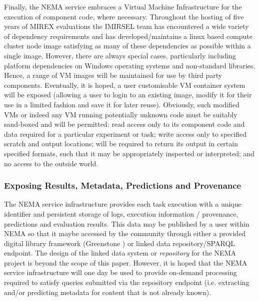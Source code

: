 \documentclass[conference]{IEEEtran}
\begin{document}
Finally, the NEMA service embraces a Virtual Machine Infrastructure for the execution of component code, where necessary. Throughout the hosting of five years of MIREX evaluations the IMIRSEL team has encountered a wide variety of dependency requirements and has developed/maintains a linux based compute cluster node image satisfying as many of these dependencies as possible within a single image. However, there are always special cases, particularly including platform dependencies on Windows operating systems and non-standard libraries. Hence, a range of VM images will be maintained for use by third party components.
Eventually, it is hoped, a user customisable VM container system will be exposed (allowing a user to login to an existing image, modify it for their use in a limited fashion and save it for later reuse).
Obviously, such modified VMs or indeed any VM running potentially unknown code must be suitably sand-boxed and will be permitted: read access only to its component code and data required for a particular experiment or task; write access only to specified scratch and output locations; will be required to return its output in certain specified formats, such that it may be appropriately inspected or interpreted; and no access to the outside world.

\subsubsection{Exposing Results, Metadata, Predictions and Provenance}
The NEMA service infrastructure provides each task execution with a unique identifier and persistent storage of logs, execution information / provenance, predictions and evaluation results. This data may be published by a user within NEMA so that it maybe accessed by the community through either a provided digital library framework (Greenstone \cite{witten2000greenstone}) or linked data repository/SPARQL endpoint. 
The design of the linked data system or \emph{repository} for the NEMA project is beyond the scope of this paper. However, it is hoped that the NEMA service infrastructure will one day be used to provide on-demand processing required to satisfy queries submitted via the repository endpoint (i.e. extracting and/or predicting metadata for content that is not already known).
\end{document}
